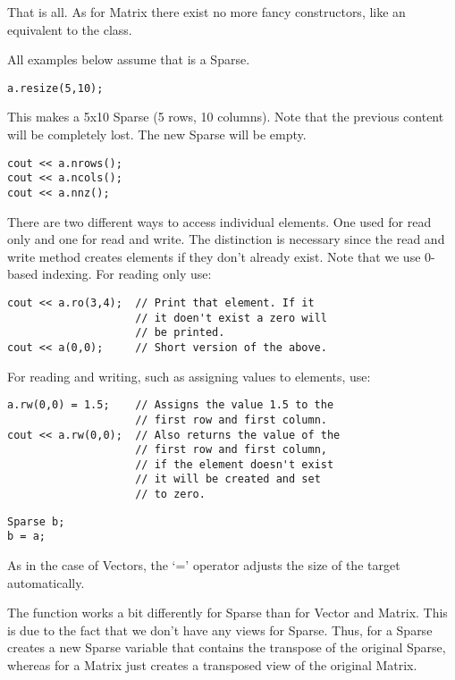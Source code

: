 That is all. As for Matrix there exist no more fancy constructors, like an
equivalent to the  class.

All examples below assume that  is a Sparse.

\begin{verbatim}
a.resize(5,10);
\end{verbatim}
This makes  a 5x10 Sparse (5 rows, 10 columns). Note that the
previous content will be completely lost. The new Sparse will be empty.

\begin{verbatim}
cout << a.nrows();
cout << a.ncols();
cout << a.nnz();
\end{verbatim}

There are two different ways to access individual elements. One used for
read only and one for read and write. The distinction is necessary since
the read and write method creates elements if they don't already exist.
Note that we use 0-based indexing. For reading only use:
\begin{verbatim}
cout << a.ro(3,4);  // Print that element. If it
                    // it doen't exist a zero will
                    // be printed.
cout << a(0,0);     // Short version of the above.
\end{verbatim}

For reading and writing, such as assigning values to elements, use:
\begin{verbatim}
a.rw(0,0) = 1.5;    // Assigns the value 1.5 to the
                    // first row and first column.
cout << a.rw(0,0);  // Also returns the value of the
                    // first row and first column,
                    // if the element doesn't exist
                    // it will be created and set
                    // to zero.
\end{verbatim}

\begin{verbatim}
Sparse b;
b = a;
\end{verbatim}

As in the case of Vectors, the `=' operator adjusts the size of the
target automatically.

 The function  works a bit
differently for Sparse than for Vector and Matrix. This is due to the
fact that we don't have any views for Sparse. Thus,
 for a Sparse creates a new Sparse variable that
contains the transpose of the original Sparse, whereas
 for a Matrix just creates a transposed view of
the original Matrix.

